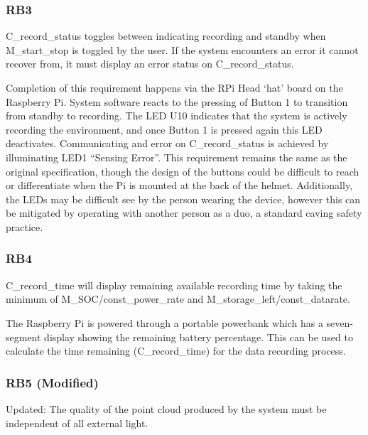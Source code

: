 \documentclass[11pt]{article}
\begin{document}
	\subsubsection{RB3} 
	
	\begin{exampleblock}
		C\_record\_status toggles between indicating recording and standby when M\_start\_stop is toggled by the user. If the system encounters an error it cannot recover from, it must display an error status on C\_record\_status.
	\end{exampleblock}
	
	Completion of this requirement happens via the RPi Head ‘hat’ board on the Raspberry Pi. System software reacts to the pressing of Button 1 to transition from standby to recording. The LED U10 indicates that the system is actively recording the environment, and once Button 1 is pressed again this LED deactivates. Communicating and error on C\_record\_status is achieved by illuminating LED1 “Sensing Error”. This requirement remains the same as the original specification, though the design of the buttons could be difficult to reach or differentiate when the Pi is mounted at the back of the helmet. Additionally, the LEDs may be difficult see by the person wearing the device, however this can be mitigated by operating with another person as a duo, a standard caving safety practice. 
	
	\subsubsection{RB4} 
	
	\begin{exampleblock}
		C\_record\_time will display remaining available recording time by taking the minimum of M\_SOC/const\_power\_rate and M\_storage\_left/const\_datarate.
	\end{exampleblock}
	
	The Raspberry Pi is powered through a portable powerbank which has a seven-segment display showing the remaining battery percentage. This can be used to calculate the time remaining (C\_record\_time) for the data recording process.
	
	\subsubsection{RB5 (Modified)} 
	
	\begin{exampleblock}[orange]
		Updated: The quality of the point cloud produced by the system must be independent of all external light.
	\end{exampleblock}
	
\end{document}
